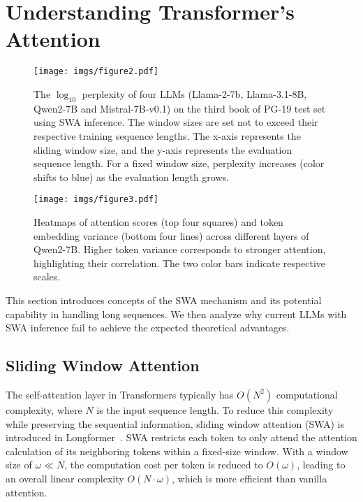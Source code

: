 \section{Understanding Transformer's Attention}


\begin{figure*}[ht]
    \hfill
    \texttt{[image: imgs/figure2.pdf]}
    \caption{The $\log_{10}$ perplexity of four LLMs (Llama-2-7b, Llama-3.1-8B, Qwen2-7B and Mistral-7B-v0.1) on the third book of PG-19 test set using SWA inference. The window sizes are set not to exceed their respective training sequence lengths. The x-axis represents the sliding window size, and the y-axis represents the evaluation sequence length. For a fixed window size, perplexity increases (color shifts to blue) as the evaluation length grows.}
    \label{fig:open-llms}
\end{figure*}

\begin{figure*}[ht]
    \centering
    \texttt{[image: imgs/figure3.pdf]}
    \caption{Heatmaps of attention scores (top four squares) and token embedding variance (bottom four lines) across different layers of Qwen2-7B. Higher token variance corresponds to stronger attention, highlighting their correlation. The two color bars indicate respective scales.}
    \label{fig:variance}
\end{figure*}

This section introduces concepts of the SWA mechanism and its potential capability in handling long sequences. We then analyze why current LLMs with SWA inference fail to achieve the expected theoretical advantages. 

\subsection{Sliding Window Attention}

The self-attention layer in Transformers typically has $O(N^2)$ computational complexity, where $N$ is the input sequence length. 
To reduce this complexity while preserving the sequential information, sliding window attention (SWA) is introduced in Longformer~\cite{Longformer}. 
SWA restricts each token to only attend the attention calculation of its neighboring tokens within a fixed-size window.
With a window size of $\omega \ll N$, the computation cost per token is reduced to $O(\omega)$, leading to an overall linear complexity $O(N \cdot \omega)$, which is more efficient than vanilla attention.

